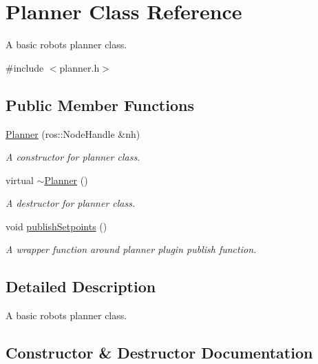 \hypertarget{classPlanner}{}\section{Planner Class Reference}
\label{classPlanner}


A basic robot\textquotesingle{}s planner class.  




{\ttfamily \#include $<$planner.\+h$>$}

\subsection*{Public Member Functions}
\begin{DoxyCompactItemize}
\item 
\hyperlink{classPlanner_a32475baddd401921adb1aab3ab842210}{Planner} (ros\+::\+Node\+Handle \&nh)
\begin{DoxyCompactList}\small\item\em A constructor for planner class. \end{DoxyCompactList}\item 
\mbox{\label{classPlanner_ac3db7cf113ad368fa6fce636b6e94abe}} 
virtual \hyperlink{classPlanner_ac3db7cf113ad368fa6fce636b6e94abe}{$\sim$\+Planner} ()
\begin{DoxyCompactList}\small\item\em A destructor for planner class. \end{DoxyCompactList}\item 
\mbox{\label{classPlanner_a8bccaf49eed3bf4d302f010b6ae4b1b7}} 
void \hyperlink{classPlanner_a8bccaf49eed3bf4d302f010b6ae4b1b7}{publish\+Setpoints} ()
\begin{DoxyCompactList}\small\item\em A wrapper function around planner plugin publish function. \end{DoxyCompactList}\end{DoxyCompactItemize}


\subsection{Detailed Description}
A basic robot\textquotesingle{}s planner class. 

\subsection{Constructor \& Destructor Documentation}
\mbox{\label{classPlanner_a32475baddd401921adb1aab3ab842210}} 
